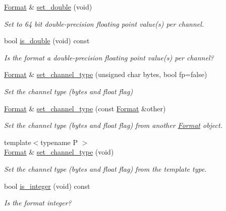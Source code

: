 \begin{DoxyCompactItemize}
\hyperlink{class_c_m_s_1_1_format}{Format} \& \hyperlink{class_c_m_s_1_1_format_a36fd3017b0985604b06fa40931f7c8cc}{set\+\_\+double} (void)
\begin{DoxyCompactList}\small\item\em Set to 64 bit double-\/precision floating point value(s) per channel. \end{DoxyCompactList}\item 
bool \hyperlink{class_c_m_s_1_1_format_aca27059973d6a9aba10b2d061f758d74}{is\+\_\+double} (void) const
\begin{DoxyCompactList}\small\item\em Is the format a double-\/precision floating point value(s) per channel? \end{DoxyCompactList}\item 
\hyperlink{class_c_m_s_1_1_format}{Format} \& \hyperlink{class_c_m_s_1_1_format_a9ef5f81a9303fd9626fc0b4004d7a01f}{set\+\_\+channel\+\_\+type} (unsigned char bytes, bool fp=false)
\begin{DoxyCompactList}\small\item\em Set the channel type (bytes and float flag) \end{DoxyCompactList}\item 
\hyperlink{class_c_m_s_1_1_format}{Format} \& \hyperlink{class_c_m_s_1_1_format_ae1e1a3d0c6bf76dab339c7b9e103b7c0}{set\+\_\+channel\+\_\+type} (const \hyperlink{class_c_m_s_1_1_format}{Format} \&other)
\begin{DoxyCompactList}\small\item\em Set the channel type (bytes and float flag) from another \hyperlink{class_c_m_s_1_1_format}{Format} object. \end{DoxyCompactList}\item 
{\footnotesize template$<$typename P $>$ }\\\hyperlink{class_c_m_s_1_1_format}{Format} \& \hyperlink{class_c_m_s_1_1_format_aaf4e13c47420efcef6a70e0a5045d708}{set\+\_\+channel\+\_\+type} (void)
\begin{DoxyCompactList}\small\item\em Set the channel type (bytes and float flag) from the template type. \end{DoxyCompactList}\item 
bool \hyperlink{class_c_m_s_1_1_format_ab3e8a623c435f878411175d6331e9e6e}{is\+\_\+integer} (void) const
\begin{DoxyCompactList}\small\item\em Is the format integer? \end{DoxyCompactList}\item 

\end{DoxyCompactItemize}

